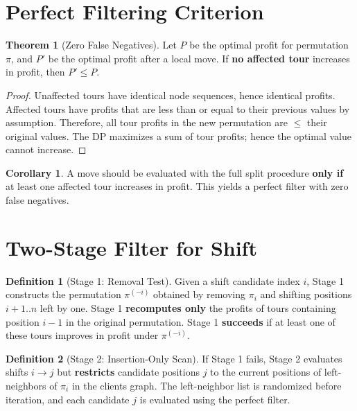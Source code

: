\documentclass[11pt]{article}
\theoremstyle{definition}
\newtheorem{definition}{Definition}[section]
\newtheorem{theorem}{Theorem}[section]
\newtheorem{corollary}{Corollary}[theorem]
\begin{document}
\section{Perfect Filtering Criterion}

\begin{theorem}[Zero False Negatives]
Let $P$ be the optimal profit for permutation $\pi$, and $P'$ be the optimal profit after a local move. If \textbf{no affected tour} increases in profit, then $P' \leq P$.
\end{theorem}

\begin{proof}
Unaffected tours have identical node sequences, hence identical profits. Affected tours have profits that are less than or equal to their previous values by assumption. Therefore, all tour profits in the new permutation are $\leq$ their original values. The DP maximizes a sum of tour profits; hence the optimal value cannot increase.
\end{proof}

\begin{corollary}
A move should be evaluated with the full split procedure \textbf{only if} at least one affected tour increases in profit. This yields a perfect filter with zero false negatives.
\end{corollary}

\section{Two-Stage Filter for Shift}

\begin{definition}[Stage 1: Removal Test]
Given a shift candidate index $i$, Stage 1 constructs the permutation $\pi^{(-i)}$ obtained by removing $\pi_i$ and shifting positions $i+1..n$ left by one. Stage 1 \textbf{recomputes only} the profits of tours containing position $i-1$ in the original permutation. Stage 1 \textbf{succeeds} if at least one of these tours improves in profit under $\pi^{(-i)}$.
\end{definition}

\begin{definition}[Stage 2: Insertion-Only Scan]
If Stage 1 fails, Stage 2 evaluates shifts $i \to j$ but \textbf{restricts} candidate positions $j$ to the current positions of left-neighbors of $\pi_i$ in the clients graph. The left-neighbor list is randomized before iteration, and each candidate $j$ is evaluated using the perfect filter.
\end{definition}
\end{document}
